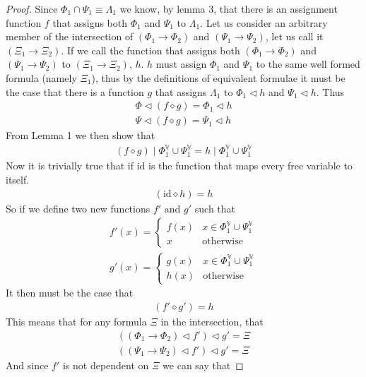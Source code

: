 \documentclass{article}
\begin{document}
\begin{proof}
Since $\Phi_1\cap \Psi_1 \equiv \Lambda_1$ we know, by lemma 3, that there is an assignment function $f$ that assigns both $\Phi_1$ and $\Psi_1$ to $\Lambda_1$.
Let us consider an arbitrary member of the intersection of $(\Phi_1\rightarrow\Phi_2)$ and $(\Psi_1\rightarrow\Psi_2)$, let us call it $(\Xi_1\rightarrow\Xi_2)$.
If we call the function that assigns both $(\Phi_1\rightarrow\Phi_2)$ and $(\Psi_1\rightarrow\Psi_2)$ to $(\Xi_1\rightarrow\Xi_2)$, $h$.
$h$ must assign $\Phi_1$ and $\Psi_1$ to the same well formed formula (namely $\Xi_1$),
thus by the definitions of equivalent formulae it must be the case that there is a function $g$ that assigns $\Lambda_1$ to $\Phi_1\lhd h$ and $\Psi_1\lhd h$.
Thus
\begin{align*}
\Phi \lhd (f\diamond g) = \Phi_1 \lhd h \\
\Psi \lhd (f\diamond g) = \Psi_1 \lhd h
\end{align*}
From Lemma 1 we then show that
\begin{align*}
(f\diamond g) \mid \Phi_1^\mathbb{V} \cup \Psi_1^\mathbb{V} = h \mid \Phi_1^\mathbb{V} \cup \Psi_1^\mathbb{V} 
\end{align*}
Now it is trivially true that if $\mathrm{id}$ is the function that maps every free variable to itself.
\begin{align*}
(\mathrm{id}\diamond h) = h
\end{align*}
So if we define two new functions $f'$ and $g'$ such that
\begin{align*}
f' (x) = \begin{cases}
f (x) & x \in \Phi_1^\mathbb{V} \cup \Psi_1^\mathbb{V} \\ 
x & \mathrm{otherwise}
\end{cases}\\
g'(x) = \begin{cases}
g (x) & x \in \Phi_1^\mathbb{V} \cup \Psi_1^\mathbb{V} \\ 
h (x) & \mathrm{otherwise}
\end{cases}
\end{align*}
It then must be the case that
\begin{align*}
(f'\diamond g') = h
\end{align*}
This means that for any formula $\Xi$ in the intersection, that
\begin{align*}
((\Phi_1\rightarrow\Phi_2)\lhd f')\lhd g' = \Xi \\
((\Psi_1\rightarrow\Psi_2)\lhd f')\lhd g' = \Xi
\end{align*}
And since $f'$ is not dependent on $\Xi$ we can say that

\end{proof}
\end{document}
